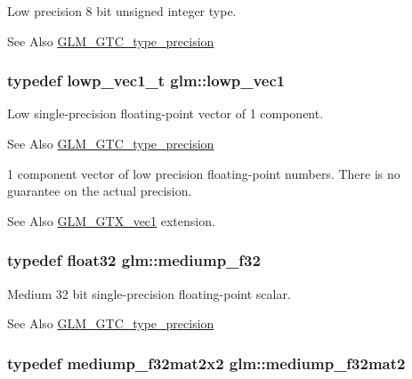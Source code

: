 Low precision 8 bit unsigned integer type. \begin{DoxySeeAlso}{See Also}
\hyperlink{group__gtc__type__precision}{G\-L\-M\-\_\-\-G\-T\-C\-\_\-type\-\_\-precision} 
\end{DoxySeeAlso}
\hypertarget{group__gtc__type__precision_gae48c64f920be353ece773ff367f0161c}{
\subsubsection[{lowp\-\_\-vec1}]{\setlength{\rightskip}{0pt plus 5cm}typedef lowp\-\_\-vec1\-\_\-t {\bf glm\-::lowp\-\_\-vec1}}}\label{group__gtc__type__precision_gae48c64f920be353ece773ff367f0161c}
Low single-\/precision floating-\/point vector of 1 component. \begin{DoxySeeAlso}{See Also}
\hyperlink{group__gtc__type__precision}{G\-L\-M\-\_\-\-G\-T\-C\-\_\-type\-\_\-precision}
\end{DoxySeeAlso}
1 component vector of low precision floating-\/point numbers. There is no guarantee on the actual precision. \begin{DoxySeeAlso}{See Also}
\hyperlink{group__gtx__vec1}{G\-L\-M\-\_\-\-G\-T\-X\-\_\-vec1} extension. 
\end{DoxySeeAlso}
\hypertarget{group__gtc__type__precision_ga3dbba6bd06a546d7a11d1c09c2f04b1a}{
\subsubsection[{mediump\-\_\-f32}]{\setlength{\rightskip}{0pt plus 5cm}typedef float32 {\bf glm\-::mediump\-\_\-f32}}}\label{group__gtc__type__precision_ga3dbba6bd06a546d7a11d1c09c2f04b1a}
Medium 32 bit single-\/precision floating-\/point scalar. \begin{DoxySeeAlso}{See Also}
\hyperlink{group__gtc__type__precision}{G\-L\-M\-\_\-\-G\-T\-C\-\_\-type\-\_\-precision} 
\end{DoxySeeAlso}
\hypertarget{group__gtc__type__precision_ga103735a38477f7c389b36aae0fbdf274}{
\subsubsection[{mediump\-\_\-f32mat2}]{\setlength{\rightskip}{0pt plus 5cm}typedef mediump\-\_\-f32mat2x2 {\bf glm\-::mediump\-\_\-f32mat2}}}\label{group__gtc__type__precision_ga103735a38477f7c389b36aae0fbdf274}
